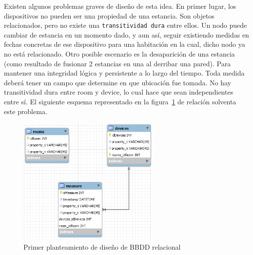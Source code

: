 \vspace{1cm}

Existen algunos problemas graves de diseño de esta idea. En primer lugar, los dispositivos no pueden ser una propiedad de una estancia. Son objetos relacionados, pero no existe una \verb|transitividad dura| entre ellos. Un nodo puede cambiar de estancia en un momento dado, y aun así, seguir existiendo medidas en fechas concretas de ese dispositivo para una habitación en la cual, dicho nodo ya no está relacionado. Otro posible escenario es la desaparición de una estancia (como resultado de fusionar 2 estancias en una al derribar una pared). Para mantener una integridad lógica y persistente a lo largo del tiempo. Toda medida deberá tener un campo que determine en que ubicación fue tomada. No hay transitividad dura entre room y device, lo cual hace que sean independientes entre sí. El siguiente esquema representado en la figura~\ref{sqlschema2} de relación solventa este problema.


\begin{figure}[hbt!]
\centering
\label{sqlschema2}
\includegraphics[height=2.5in]{figures/SQLSchemaExample_2.png}
\caption[Segundo planteamiento de diseño de BBDD relacional]{Primer planteamiento de diseño de BBDD relacional\footnotemark}
\end{figure}

\vspace{1cm}


